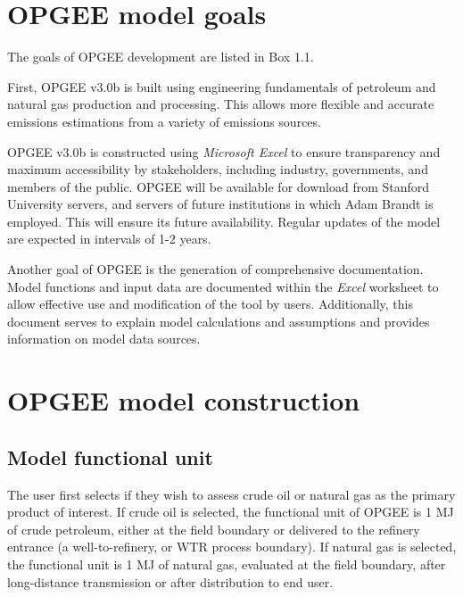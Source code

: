 \documentclass[11pt]{report}
\newcommand{\version}{v3.0b }
\begin{document}
\clearpage

\section{OPGEE model goals}

The goals of OPGEE development are listed in Box 1.1. 

First, OPGEE \version is built using engineering fundamentals of petroleum and natural gas production and processing. This allows more flexible and accurate emissions estimations from a variety of emissions sources.

OPGEE \version is constructed using \emph{Microsoft Excel} to ensure transparency and maximum accessibility by stakeholders, including industry, governments, and members of the public. OPGEE will be available for download from Stanford University servers, and servers of future institutions in which Adam Brandt is employed. This will ensure its future availability. Regular updates of the model are expected in intervals of 1-2 years.

Another goal of OPGEE is the generation of comprehensive documentation. Model functions and input data are documented within the \emph{Excel} worksheet to allow effective use and modification of the tool by users. Additionally, this document serves to explain model calculations and assumptions and provides information on model data sources.




\clearpage

\section{OPGEE model construction}

\subsection{Model functional unit}

The user first selects if they wish to assess crude oil or natural gas as the primary product of interest. If crude oil is selected, the functional unit of OPGEE is 1 MJ of crude petroleum, either at the field boundary or delivered to the refinery entrance (a well-to-refinery, or WTR process boundary). If natural gas is selected, the functional unit is 1 MJ of natural gas, evaluated at the field boundary, after  long-distance transmission or after distribution to end user. 
\end{document}
